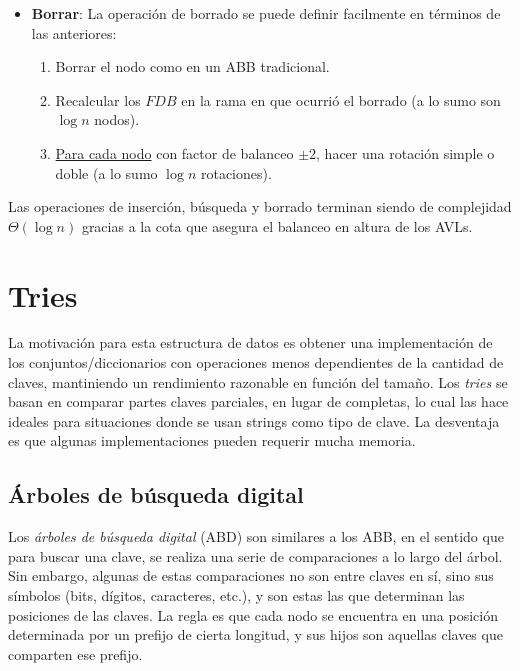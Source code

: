 \documentclass{article}
\newcommand{\BigTheta}[1]{{\Theta(#1)}}
\begin{document}
\begin{itemize}
    \item \textbf{Borrar}: La operación de borrado se puede definir facilmente en términos de las anteriores:
          \begin{enumerate}
              \item Borrar el nodo como en un ABB tradicional.
              \item Recalcular los $FDB$ en la rama en que ocurrió el borrado (a lo sumo son $\log{n}$ nodos).
              \item \underline{Para cada nodo} con factor de balanceo $\pm 2$, hacer una rotación simple o doble (a lo sumo $\log{n}$ rotaciones).
          \end{enumerate}


\end{itemize}

Las operaciones de inserción, búsqueda y borrado terminan siendo de complejidad $\BigTheta{\log{n}}$ gracias a la cota que asegura el balanceo en altura de los AVLs.

\section{Tries}

La motivación para esta estructura de datos es obtener una implementación de los conjuntos/diccionarios con operaciones menos dependientes de la cantidad de claves, mantiniendo un rendimiento razonable en función del tamaño. Los \textit{tries} se basan en comparar partes claves parciales, en lugar de completas, lo cual las hace ideales para situaciones donde se usan strings como tipo de clave. La desventaja es que algunas implementaciones pueden requerir mucha memoria.

\subsection{Árboles de búsqueda digital}

Los \textit{árboles de búsqueda digital} (ABD) son similares a los ABB, en el sentido que para buscar una clave, se realiza una serie de comparaciones a lo largo del árbol. Sin embargo, algunas de estas comparaciones no son entre claves en sí, sino sus símbolos (bits, dígitos, caracteres, etc.), y son estas las que determinan las posiciones de las claves. La regla es que cada nodo se encuentra en una posición determinada por un prefijo de cierta longitud, y sus hijos son aquellas claves que comparten ese prefijo.
\end{document}
